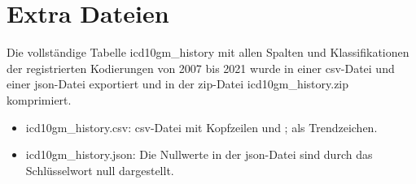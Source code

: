 \chapter{Extra Dateien} \label{ch:extrafiles}

 Die vollständige Tabelle \textsf{icd10gm\_history} mit allen Spalten und Klassifikationen der registrierten Kodierungen von 2007 bis 2021 wurde in einer \ac{csv}-Datei und einer \ac{json}-Datei exportiert und in der \ac{zip}-Datei \textsf{icd10gm\_history.zip} komprimiert.
 
 \begin{itemize}
 	\item \textsf{icd10gm\_history.csv}: \ac{csv}-Datei mit Kopfzeilen und \glqq ;\grqq{} als Trendzeichen.
 	\item \textsf{icd10gm\_history.json}: Die Nullwerte in der \ac{json}-Datei sind durch das Schlüsselwort \glqq \textsf{null}\grqq{} dargestellt.
 \end{itemize}